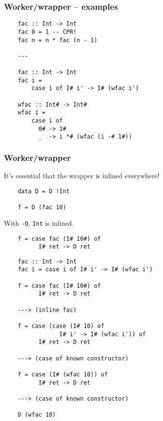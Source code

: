 \documentclass{beamer}
\begin{document}
\begin{frame}[fragile]
    \frametitle{Worker/wrapper -- examples}

    \begin{verbatim}
    fac :: Int -> Int
    fac 0 = 1 -- CPR!
    fac n = n * fac (n - 1)

    ---

    fac :: Int -> Int
    fac i =
        case i of I# i' -> I# (wfac i')

    wfac :: Int# -> Int#
    wfac i =
        case i of
          0# -> 1#
          _  -> i *# (wfac (i -# 1#))
    \end{verbatim}

\end{frame}

\begin{frame}[fragile]
    \frametitle{Worker/wrapper}

    It's essential that the wrapper is inlined everywhere! \\

    \begin{verbatim}
    data D = D !Int

    f = D (fac 10)
    \end{verbatim}

    With \texttt{-O}, \texttt{Int} is inlined. \\

    \begin{verbatim}
    f = case fac (I# 10#) of
          I# ret -> D ret
    \end{verbatim}

\end{frame}

\begin{frame}[fragile]
    \begin{verbatim}
    fac :: Int -> Int
    fac i = case i of I# i' -> I# (wfac i')

    f = case fac (I# 10#) of
          I# ret -> D ret

    ---> (inline fac)

    f = case (case (I# 10) of
                I# i' -> I# (wfac i')) of
          I# ret -> D ret

    ---> (case of known constructor)

    f = case (I# (wfac 10)) of
          I# ret -> D ret

    ---> (case of known constructor)

    D (wfac 10)
    \end{verbatim}
\end{frame}
\end{document}
